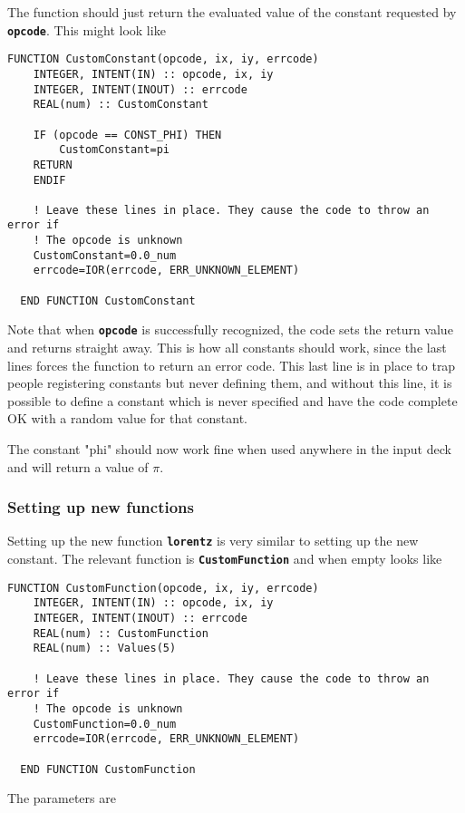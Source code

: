 \documentclass[12pt,a4paper]{article}
\newcommand{\simpleboxverbatim}{\begin{Verbatim}[obeytabs=true,frame=single,
  framerule=0.5mm,rulecolor=\color{warwickmid},formatcom=\color{black}]}
\newcommand{\inlinecode}[1]{{\color{warwickred} \bf\texttt{#1}}}
\begin{document}
The function should just return the evaluated value of the constant requested
by \inlinecode{opcode}. This might look like

\simpleboxverbatim
  FUNCTION CustomConstant(opcode, ix, iy, errcode)
    INTEGER, INTENT(IN) :: opcode, ix, iy
    INTEGER, INTENT(INOUT) :: errcode
    REAL(num) :: CustomConstant

    IF (opcode == CONST_PHI) THEN
    	CustomConstant=pi
	RETURN
    ENDIF

    ! Leave these lines in place. They cause the code to throw an error if
    ! The opcode is unknown
    CustomConstant=0.0_num
    errcode=IOR(errcode, ERR_UNKNOWN_ELEMENT)

  END FUNCTION CustomConstant
\end{Verbatim}

Note that when \inlinecode{opcode} is successfully recognized, the code sets
the return value and returns straight away. This is how all constants should
work, since the last lines forces the function to return an error code. This
last line is in place to trap people registering constants but never defining
them, and without this line, it is possible to define a constant which is
never specified and have the code complete OK with a random value for that
constant.

The constant "phi" should now work fine when used anywhere in the input deck
and will return a value of $\pi$.

\subsubsection{Setting up new functions}

Setting up the new function \inlinecode{lorentz} is very similar to setting up
the new constant. The relevant function is \inlinecode{CustomFunction} and
when empty looks like

\simpleboxverbatim
  FUNCTION CustomFunction(opcode, ix, iy, errcode)
    INTEGER, INTENT(IN) :: opcode, ix, iy
    INTEGER, INTENT(INOUT) :: errcode
    REAL(num) :: CustomFunction
    REAL(num) :: Values(5)

    ! Leave these lines in place. They cause the code to throw an error if
    ! The opcode is unknown
    CustomFunction=0.0_num
    errcode=IOR(errcode, ERR_UNKNOWN_ELEMENT)

  END FUNCTION CustomFunction
\end{Verbatim}

The parameters are
\end{document}

